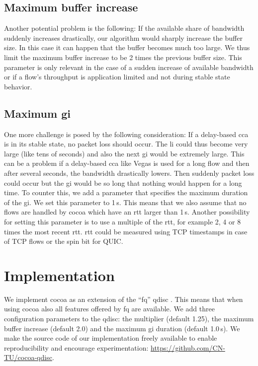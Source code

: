 \documentclass[sigconf, 10pt, letterpaper,dvipsnames\ifx\removeHeaders\tempYes ,nonacm\fi]{acmart}
\begin{document}
\subsection{Maximum buffer increase}

Another potential problem is the following: If the available share of bandwidth suddenly increases drastically, our algorithm would sharply increase the buffer size. In this case it can happen that the buffer becomes much too large. We thus limit the maximum buffer increase to be 2 times the previous buffer size. This parameter is only relevant in the case of a sudden increase of available bandwidth or if a flow's throughput is application limited and not during stable state behavior. 

\subsection{Maximum \gls{gi}}

One more challenge is posed by the following consideration: If a delay-based \gls{cca} is in its stable state, no packet loss should occur. The \gls{li} could thus become very large (like tens of seconds) and also the next \gls{gi} would be extremely large. This can be a problem if a delay-based \gls{cca} like Vegas \cite{brakmo_tcp_1995} is used for a long flow and then after several seconds, the bandwidth drastically lowers. Then suddenly packet loss could occur but the \gls{gi} would be so long that nothing would happen for a long time. To counter this, we add a parameter that specifies the maximum duration of the \gls{gi}. We set this parameter to 1\,s. This means that we also assume that no flows are handled by \gls{cocoa} which have an \gls{rtt} larger than 1\,s. Another possibility for setting this parameter is to use a multiple of the \gls{rtt}, for example 2, 4 or 8 times the most recent \gls{rtt}. \gls{rtt} could be measured using TCP timestamps \cite{borman_tcp_2014} in case of TCP flows or the spin bit \cite{kuhlewind_quic_2018} for QUIC. 

\section{Implementation}

We implement \gls{cocoa} as an extension of the ``fq'' \gls{qdisc} \cite{dumazet_pkt_sched:_2013}. This means that when using \gls{cocoa} also all features offered by fq are available. We add three configuration parameters to the \gls{qdisc}: the multiplier (default 1.25), the maximum buffer increase (default 2.0) and the maximum \gls{gi} duration (default 1.0\,s). We make the source code of our implementation freely available to enable reproducibility and encourage experimentation: \url{https://github.com/CN-TU/cocoa-qdisc}.
\end{document}
